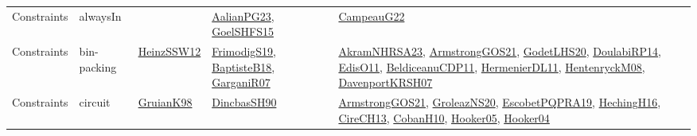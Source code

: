 {\begin{longtable}{lp{3cm}>{\raggedright}p{6cm}>{\raggedright}p{6cm}p{8cm}}
Constraints & alwaysIn &  & \href{papers/AalianPG23.pdf}{AalianPG23}\cite{AalianPG23}, \href{articles/GoelSHFS15.pdf}{GoelSHFS15}\cite{GoelSHFS15} & \href{articles/CampeauG22.pdf}{CampeauG22}\cite{CampeauG22}\\
Constraints & bin-packing & \href{articles/HeinzSSW12.pdf}{HeinzSSW12}\cite{HeinzSSW12} & \href{papers/FrimodigS19.pdf}{FrimodigS19}\cite{FrimodigS19}, \href{articles/BaptisteB18.pdf}{BaptisteB18}\cite{BaptisteB18}, \href{papers/GarganiR07.pdf}{GarganiR07}\cite{GarganiR07} & \href{articles/AkramNHRSA23.pdf}{AkramNHRSA23}\cite{AkramNHRSA23}, \href{papers/ArmstrongGOS21.pdf}{ArmstrongGOS21}\cite{ArmstrongGOS21}, \href{papers/GodetLHS20.pdf}{GodetLHS20}\cite{GodetLHS20}, \href{papers/DoulabiRP14.pdf}{DoulabiRP14}\cite{DoulabiRP14}, \href{papers/EdisO11.pdf}{EdisO11}\cite{EdisO11}, \href{articles/BeldiceanuCDP11.pdf}{BeldiceanuCDP11}\cite{BeldiceanuCDP11}, \href{papers/HermenierDL11.pdf}{HermenierDL11}\cite{HermenierDL11}, \href{papers/HentenryckM08.pdf}{HentenryckM08}\cite{HentenryckM08}, \href{papers/DavenportKRSH07.pdf}{DavenportKRSH07}\cite{DavenportKRSH07}\\
Constraints & circuit & \href{papers/GruianK98.pdf}{GruianK98}\cite{GruianK98} & \href{articles/DincbasSH90.pdf}{DincbasSH90}\cite{DincbasSH90} & \href{papers/ArmstrongGOS21.pdf}{ArmstrongGOS21}\cite{ArmstrongGOS21}, \href{papers/GroleazNS20.pdf}{GroleazNS20}\cite{GroleazNS20}, \href{articles/EscobetPQPRA19.pdf}{EscobetPQPRA19}\cite{EscobetPQPRA19}, \href{papers/HechingH16.pdf}{HechingH16}\cite{HechingH16}, \href{papers/CireCH13.pdf}{CireCH13}\cite{CireCH13}, \href{papers/CobanH10.pdf}{CobanH10}\cite{CobanH10}, \href{articles/Hooker05.pdf}{Hooker05}\cite{Hooker05}, \href{papers/Hooker04.pdf}{Hooker04}\cite{Hooker04}\\

\end{longtable}}
